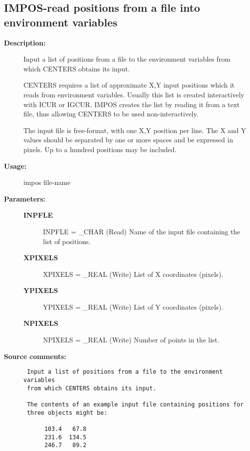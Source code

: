 \subsection{IMPOS-\label{IMPOS}read positions from a file into environment variables}
\begin{description}

\item [{\bf Description:}]
 Input a list of positions from a file to the environment variables
 from which CENTERS obtains its input.

 CENTERS requires a list of approximate X,Y input positions which
 it reads from environment variables.  Usually this list is created
 interactively with ICUR or IGCUR.  IMPOS creates the list by
 reading it from a text file, thus allowing CENTERS to be used
 non-interactively.

 The input file is free-format, with one X,Y position per line.
 The X and Y values should be separated by one or more spaces and
 be expressed in pixels.  Up to a hundred positions may be included.

\item [{\bf Usage:}]
 impos file-name

\item [{\bf Parameters:}]
\begin{description}
\item [{\bf INPFLE}]
INPFLE  =  _CHAR (Read)
   Name of the input file containing the list of positions.
\item [{\bf XPIXELS}]
XPIXELS  = _REAL (Write)
   List of X coordinates (pixels).
\item [{\bf YPIXELS}]
YPIXELS  = _REAL (Write)
  List of Y coordinates (pixels).
\item [{\bf NPIXELS}]
NPIXELS  =  _REAL (Write)
  Number of points in the list.
\end{description}

\item [{\bf Source comments:}]
\begin{verbatim}
 Input a list of positions from a file to the environment variables
 from which CENTERS obtains its input.

 The contents of an example input file containing positions for
 three objects might be:

      103.4   67.8
      231.6  134.5
      246.7   89.2
\end{verbatim}
\end{description}
